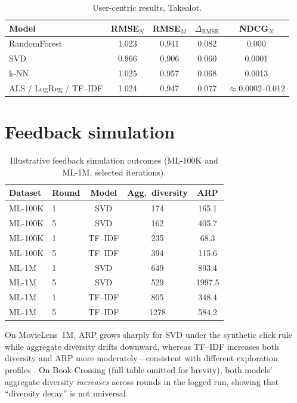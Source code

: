 \documentclass[11pt,a4paper,twoside,openright]{report}
\begin{document}
\begin{table}[htbp]
  \centering
  \caption{User-centric results, Takealot.}
  \label{tab:fairtake}
  \begin{tabular}{lcccc}
    \toprule
    Model & RMSE$_N$ & RMSE$_M$ & $\Delta_{\mathrm{RMSE}}$ & NDCG$_N$ \\
    \midrule
    RandomForest & 1.023 & 0.941 & 0.082 & 0.000 \\
    SVD & 0.966 & 0.906 & 0.060 & 0.0001 \\
    k-NN & 1.025 & 0.957 & 0.068 & 0.0013 \\
    ALS / LogReg / TF--IDF & 1.024 & 0.947 & 0.077 & $\approx$0.0002--0.012 \\
    \bottomrule
  \end{tabular}
\end{table}

\section{Feedback simulation}
\begin{table}[htbp]
  \centering
  \caption{Illustrative feedback simulation outcomes (ML-100K and ML-1M, selected iterations).}
  \label{tab:feedback}
  \begin{tabular}{llccc}
    \toprule
    Dataset & Round & Model & Agg.~diversity & ARP \\
    \midrule
    ML-100K & 1 & SVD & 174 & 165.1 \\
    ML-100K & 5 & SVD & 162 & 405.7 \\
    ML-100K & 1 & TF--IDF & 235 & 68.3 \\
    ML-100K & 5 & TF--IDF & 394 & 115.6 \\
    ML-1M & 1 & SVD & 649 & 893.4 \\
    ML-1M & 5 & SVD & 529 & 1997.5 \\
    ML-1M & 1 & TF--IDF & 805 & 348.4 \\
    ML-1M & 5 & TF--IDF & 1278 & 584.2 \\
    \bottomrule
  \end{tabular}
\end{table}

On MovieLens~1M, ARP grows sharply for SVD under the synthetic click rule while aggregate diversity drifts downward, whereas TF--IDF increases both diversity and ARP more moderately---consistent with different exploration profiles \citep{chaney2018algorithmic}. On Book-Crossing (full table omitted for brevity), both models' aggregate diversity \emph{increases} across rounds in the logged run, showing that ``diversity decay'' is not universal.
\end{document}
